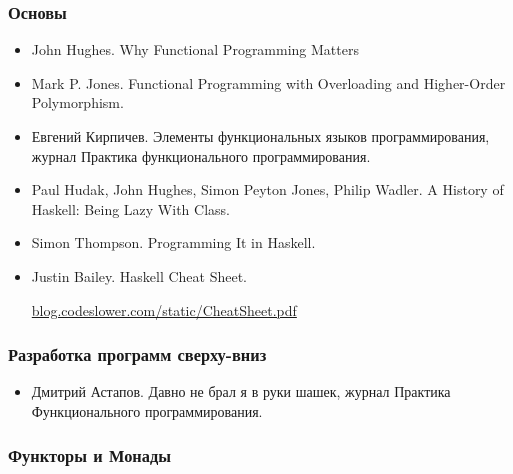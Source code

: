 

\subsubsection{Основы}

\begin{itemize}
\item John Hughes. Why Functional Programming Matters

\item Mark P. Jones. Functional Programming with Overloading
    and Higher-Order Polymorphism.

\item Евгений Кирпичев. Элементы функциональных 
    языков программирования, журнал Практика функционального
    программирования.

\item Paul Hudak, John Hughes, Simon Peyton Jones, Philip Wadler.
    A History of Haskell: Being Lazy With Class.

\item Simon Thompson. Programming It in Haskell.

\item Justin Bailey. Haskell Cheat Sheet.

    \url{blog.codeslower.com/static/CheatSheet.pdf}

\end{itemize}


\subsubsection{Разработка программ сверху-вниз}

\begin{itemize}
\item Дмитрий Астапов. Давно не брал я в руки шашек,
    журнал Практика Функционального программирования.
\end{itemize}


\subsubsection{Функторы и Монады}

